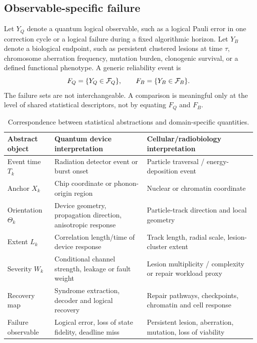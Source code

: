 \documentclass[11pt,a4paper,oneside]{article}
\begin{document}
\subsection{Observable-specific failure}
Let \(Y_Q\) denote a quantum logical observable, such as a logical Pauli error in one correction cycle or a logical failure during a fixed algorithmic horizon. Let \(Y_B\) denote a biological endpoint, such as persistent clustered lesions at time \(\tau\), chromosome aberration frequency, mutation burden, clonogenic survival, or a defined functional phenotype. A generic reliability event is
\begin{equation}\label{eq:failure}
F_Q=\{Y_Q\in\mathcal{F}_Q\},\qquad F_B=\{Y_B\in\mathcal{F}_B\}.
\end{equation}
The failure sets are not interchangeable. A comparison is meaningful only at the level of shared statistical descriptors, not by equating \(F_Q\) and \(F_B\).

\begin{table}[t]\centering\small\caption{Correspondence between statistical abstractions and domain-specific quantities.}\label{tab:correspondence}\begin{tabularx}{\linewidth}{p{.2\linewidth}XX}\toprule
Abstract object & Quantum device interpretation & Cellular/radiobiology interpretation\\\midrule
Event time \(T_k\) & Radiation detector event or burst onset & Particle traversal / energy-deposition event\\
Anchor \(X_k\) & Chip coordinate or phonon-origin region & Nuclear or chromatin coordinate\\
Orientation \(\Theta_k\) & Device geometry, propagation direction, anisotropic response & Particle-track direction and local geometry\\
Extent \(L_k\) & Correlation length/time of device response & Track length, radial scale, lesion-cluster extent\\
Severity \(W_k\) & Conditional channel strength, leakage or fault weight & Lesion multiplicity / complexity or repair workload proxy\\
Recovery map & Syndrome extraction, decoder and logical recovery & Repair pathways, checkpoints, chromatin and cell response\\
Failure observable & Logical error, loss of state fidelity, deadline miss & Persistent lesion, aberration, mutation, loss of viability\\\bottomrule\end{tabularx}\end{table}
\end{document}

